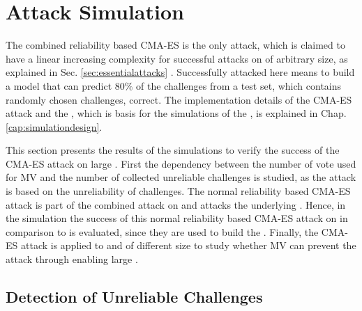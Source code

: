 \chapter{Attack Simulation}
\label{cap:attacksimulations}


The combined reliability based \ac{CMA-ES} is the only attack, which is claimed to have a linear increasing complexity for successful attacks on \xpufs of arbitrary size, as explained in Sec. \ref{sec:essentialattacks} \cite{Becker2015ThePUFs}.
Successfully attacked here means to build a model that can predict $80 \%$ of the challenges from a test set, which contains randomly chosen challenges, correct.
The implementation details of the \ac{CMA-ES} attack and the \apuf, which is basis for the simulations of the \mpuf, is explained in Chap. \ref{cap:simulationdesign}.

This section presents the results of the simulations to verify the success of the \ac{CMA-ES} attack on large \xpufs.
First the dependency between the number of vote used for \ac{MV} and the number of collected unreliable challenges is studied, as the attack is based on the unreliability of challenges.
The normal reliability based \ac{CMA-ES} attack is part of the combined attack on \mxpufs and attacks the underlying \mpufs.
Hence, in the simulation the success of this normal reliability based \ac{CMA-ES} attack on \mpufs in comparison to \apufs is evaluated, since they are used to build the \mxpuf.
Finally, the \ac{CMA-ES} attack is applied to \xpufs and \mxpufs of different size to study whether \ac{MV} can prevent the attack through enabling large \mxpufs. 


\section{Detection of Unreliable Challenges}
\label{sec:detectionofunreliablechallenges}

